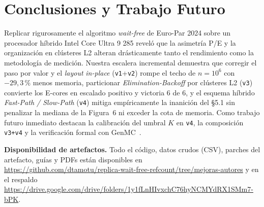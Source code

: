 \documentclass[10pt,twocolumn,a4paper]{article}
\begin{document}
\begin{table}[H]
\centering
\caption{Evolución integrada de \texttt{Autores} a \texttt{v1}--\texttt{v4} (24 hilos, Core Ultra 9 285).}
\label{tab:resumen_global}
\footnotesize
{}
\end{table}

\section{Conclusiones y Trabajo Futuro}

Replicar rigurosamente el algoritmo \emph{wait-free} de Euro-Par 2024 sobre un procesador híbrido Intel Core Ultra 9 285 reveló que la asimetría P/E y la organización en clústeres L2 alteran drásticamente tanto el rendimiento como la metodología de medición. Nuestra escalera incremental demuestra que corregir el paso por valor y el \emph{layout} \emph{in-place} (\texttt{v1}+\texttt{v2}) rompe el techo de $n=10^6$ con $-29{,}3\,\%$ menos memoria, particionar \emph{Elimination-Backoff} por clústeres L2 (\texttt{v3}) convierte los E-cores en escalado positivo y victoria 6 de 6, y el esquema híbrido \emph{Fast-Path / Slow-Path} (\texttt{v4}) mitiga empíricamente la inanición del \S 5.1 sin penalizar la mediana de la Figura~6 ni exceder la cota de memoria. Como trabajo futuro inmediato destacan la calibración del umbral $K$ en \texttt{v4}, la composición \texttt{v3+v4} y la verificación formal con GenMC~\cite{kokologiannakis2021genmc}.

\textbf{Disponibilidad de artefactos.} Todo el código, datos crudos (CSV), parches del artefacto, guías y PDFs están disponibles en \url{https://github.com/dtamotu/replica-wait-free-refcount/tree/mejoras-autores} y en el respaldo \url{https://drive.google.com/drive/folders/1y1fLnHIvxchC76hyNCMYdRX1SMm7-bPK}.

\balance


\end{document}
